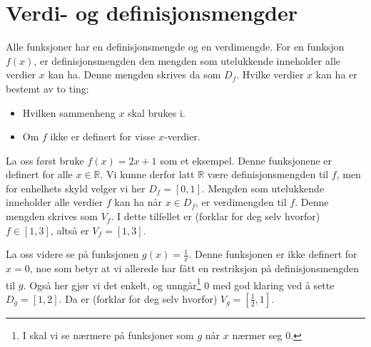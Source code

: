 \section{Verdi- og definisjonsmengder}
Alle funksjoner har en definisjonsmengde og en verdimengde. For en funksjon $ f(x) $, er definisjonsmengden den mengden som utelukkende inneholder alle verdier $ x $ kan ha. Denne mengden skrives da som $ D_f $. Hvilke verdier $ x $ kan ha er bestemt av to ting:
\begin{itemize}
	\item Hvilken sammenheng $ x $ skal brukes i.
	\item Om $ f $ ikke er definert for visse $ x $-verdier.
\end{itemize}

La oss først bruke $ f(x)=2x+1 $ som et eksempel. Denne funksjonene er definert for alle $ x\in \mathbb{R} $. Vi kunne derfor latt $ \mathbb{R} $ være definisjonsmengden til $ f $, men for enhelhets skyld velger vi her $ D_f=[0, 1] $. Mengden som utelukkende inneholder alle verdier $ f $ kan ha når $ x\in D_f $, er verdimengden til $ f $. Denne mengden skrives som $ V_f $. I dette tilfellet er (forklar for deg selv hvorfor) $ f\in [1, 3] $, altså er $ V_f=[1, 3] $.\vsk

La oss videre se på funksjonen $ g(x)=\frac{1}{x} $. Denne funksjonen er ikke definert for $ x=0 $, noe som betyr at vi allerede har fått en restriksjon på definisjonsmengden til $ g $. Også her gjør vi det enkelt, og unngår\footnote{I  skal vi se nærmere på funksjoner som $ g $ når $ x $ nærmer seg 0.} 0 med god klaring ved å sette $ D_g=[1, 2] $. Da er (forklar for deg selv hvorfor) $ V_g=\left[\frac{1}{2}, 1\right] $.\regv
 

